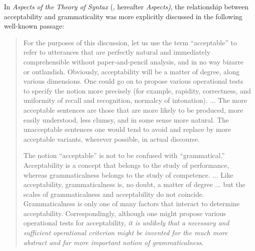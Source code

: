 
In \textit{Aspects of the Theory of Syntax} (\citet{Chomsky1965}, hereafter \textit{Aspects)}, the relationship between acceptability and grammaticality was more explicitly discussed in the following well-known passage:

\begin{quote}
For the purposes of this discussion, let us use the term ``acceptable'' to refer to utterances that are perfectly natural and immediately comprehensible without paper-and-pencil analysis, and in no way bizarre or outlandish. Obviously, acceptability will be a matter of degree, along various dimensions. One could go on to propose various operational tests to specify the notion more precisely (for example, rapidity, correctness, and uniformity of recall and recognition, normalcy of intonation). ... The more acceptable sentences are those that are more likely to be produced, more easily understood, less clumsy, and in some sense more natural. The unacceptable sentences one would tend to avoid and replace by more acceptable variants, wherever possible, in actual discourse.

The notion ``acceptable'' is not to be confused with ``grammatical.'' Acceptability is a concept that belongs to the study of performance, whereas grammaticalness belongs to the study of competence. ... Like acceptability, grammaticalness is, no doubt, a matter of degree ... but the scales of grammaticalness and acceptability do not coincide. Grammaticalness is only one of many factors that interact to determine acceptability. Correspondingly, although one might propose various operational tests for acceptability, \textit{it is unlikely that a necessary and sufficient operational criterion might be invented for the much more abstract and far more important notion of grammaticalness}. \citet[10--11]{Aspects}
\end{quote}

